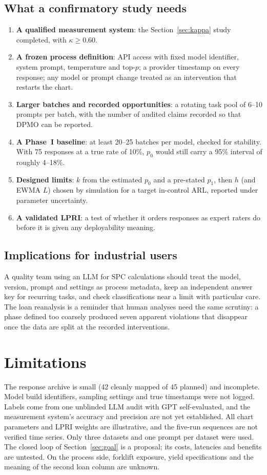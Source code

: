 \documentclass[11pt]{article}
\begin{document}
\subsection{What a confirmatory study needs}
\begin{enumerate}[leftmargin=*]
\item \textbf{A qualified measurement system}: the Section~\ref{sec:kappa} study completed, with $\kappa\ge0.60$.
\item \textbf{A frozen process definition}: API access with fixed model identifier, system prompt, temperature and top-$p$; a provider timestamp on every response; any model or prompt change treated as an intervention that restarts the chart.
\item \textbf{Larger batches and recorded opportunities}: a rotating task pool of 6--10 prompts per batch, with the number of audited claims recorded so that DPMO can be reported.
\item \textbf{A Phase~I baseline}: at least 20--25 batches per model, checked for stability. With 75 responses at a true rate of 10\%, $p_0$ would still carry a 95\% interval of roughly 4--18\%.
\item \textbf{Designed limits}: $k$ from the estimated $p_0$ and a pre-stated $p_1$, then $h$ (and EWMA $L$) chosen by simulation for a target in-control ARL, reported under parameter uncertainty.
\item \textbf{A validated LPRI}: a test of whether it orders responses as expert raters do before it is given any deployability meaning.
\end{enumerate}

\subsection{Implications for industrial users}
A quality team using an LLM for SPC calculations should treat the model, version, prompt and settings as process metadata, keep an independent answer key for recurring tasks, and check classifications near a limit with particular care. The loan reanalysis is a reminder that human analyses need the same scrutiny: a phase defined too coarsely produced seven apparent violations that disappear once the data are split at the recorded interventions.

\section{Limitations}
The response archive is small (42 cleanly mapped of 45 planned) and incomplete. Model build identifiers, sampling settings and true timestamps were not logged. Labels come from one unblinded LLM audit with GPT self-evaluated, and the measurement system's accuracy and precision are not yet established. All chart parameters and LPRI weights are illustrative, and the five-run sequences are not verified time series. Only three datasets and one prompt per dataset were used. The closed loop of Section~\ref{sec:goal} is a proposal; its costs, latencies and benefits are untested. On the process side, forklift exposure, yield specifications and the meaning of the second loan column are unknown.
\end{document}

